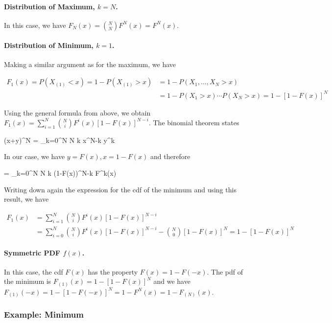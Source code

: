 \paragraph{Distribution of Maximum, $k=N$.} In this case, we have $F_N(x) = {N \choose N} F^N(x) = F^N(x)$.

\paragraph{Distribution of Minimum, $k=1$.} Making a similar argument as for the maximum, we have 

\begin{align*}
F_1(x) = P(X_{(1)} < x) = 1 - P(X_{(1)} > x) & = 1 - P(X_1, \ldots, X_N > x) \\ & = 1 - P(X_1 > x) \cdots P(X_N > x) = 1 - \left[1- F(x)\right]^N
\end{align*}

Using the general formula from above, we obtain $F_1(x) = \sum_{i=1}^N {N \choose i} F^i(x) \left[ 1 - F(x) \right]^{N-i}$. The binomial theorem states

\bee
(x+y)^N = \sum_{k=0}^N {N \choose k} x^{N-k} y^k
\eee

In our case, we have $y = F(x), x = 1 - F(x)$ and therefore

 = \sum_{k=0}^N {N \choose k} (1-F(x))^{N-k} F^k(x)
\eee

Writing down again the expression for the cdf of the minimum and using this result, we have

\begin{align*}
F_1(x) & = \sum_{i=1}^N {N \choose i} F^i(x) \left[ 1 - F(x) \right]^{N-i} \\ & = \sum_{i=0}^N {N \choose i} F^i(x) \left[ 1 - F(x) \right]^{N-i} - {N \choose 0} \left[ 1 - F(x) \right]^{N} = 1 - \left[ 1 - F(x) \right]^{N}
\end{align*}

\paragraph{Symmetric PDF $f(x)$.} In this case, the cdf $F(x)$ has the property $F(x) = 1 - F(-x)$. The pdf of the minimum is $F_{(1)}(x) = 1 - \left[ 1 - F(x) \right]^{N}$ and we have $F_{(1)}(-x) = 1 - \left[ 1 - F(-x) \right]^{N} = 1-F^N(x) = 1 - F_{(N)}(x)$.


\subsubsection{Example: Minimum}

